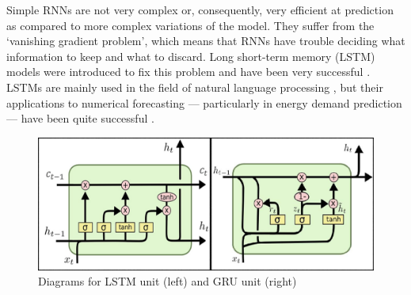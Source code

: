 \documentclass[12pt]{scrreprt}
\begin{document}
Simple RNNs are not very complex or, consequently, very efficient at prediction as compared to more complex variations of the model. They suffer from the `vanishing gradient problem', which means that RNNs have trouble deciding what information to keep and what to discard. Long short-term memory (LSTM) models were introduced to fix this problem and have been very successful \cite{Nti20, Chung22, Olah15}. LSTMs are mainly used in the field of natural language processing \cite{Olah15, Yin17}, but their applications to numerical forecasting --- particularly in energy demand prediction --- have been quite successful \cite{Nti20, Chung22}.

\begin{figure}[h!]
    \centering
    \includegraphics[scale=0.8]{Images/lstm_gru.png}
    \caption{Diagrams for LSTM unit (left) and GRU unit (right) \cite{Olah15}}
    \label{fig:lstm_gru}
\end{figure}
\end{document}
